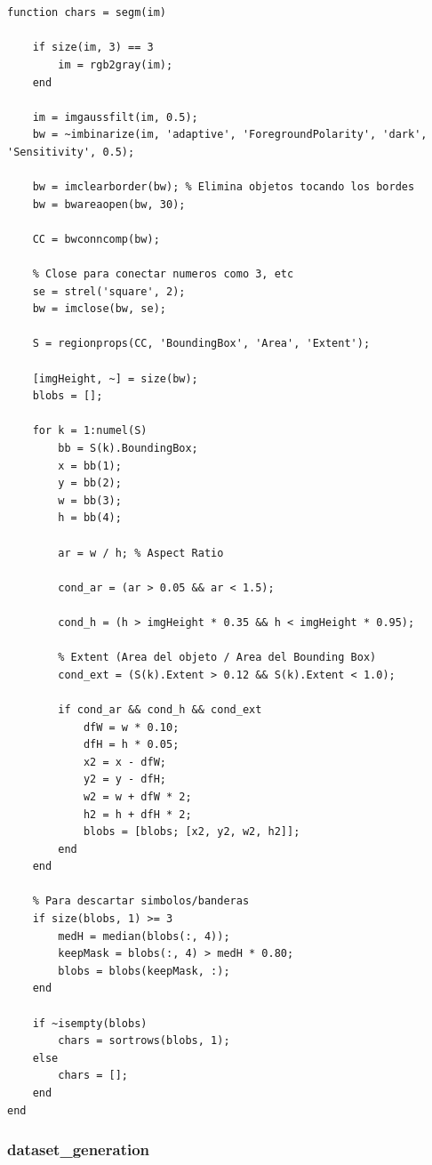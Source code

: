 \begin{verbatim}


function chars = segm(im)
   
    if size(im, 3) == 3
        im = rgb2gray(im);
    end

    im = imgaussfilt(im, 0.5);
    bw = ~imbinarize(im, 'adaptive', 'ForegroundPolarity', 'dark', 'Sensitivity', 0.5);

    bw = imclearborder(bw); % Elimina objetos tocando los bordes
    bw = bwareaopen(bw, 30); 

    CC = bwconncomp(bw);

    % Close para conectar numeros como 3, etc
    se = strel('square', 2); 
    bw = imclose(bw, se);

    S = regionprops(CC, 'BoundingBox', 'Area', 'Extent');
    
    [imgHeight, ~] = size(bw);
    blobs = [];

    for k = 1:numel(S)
        bb = S(k).BoundingBox;
        x = bb(1); 
        y = bb(2); 
        w = bb(3); 
        h = bb(4);

        ar = w / h; % Aspect Ratio

        cond_ar = (ar > 0.05 && ar < 1.5);

        cond_h = (h > imgHeight * 0.35 && h < imgHeight * 0.95);

        % Extent (Area del objeto / Area del Bounding Box)
        cond_ext = (S(k).Extent > 0.12 && S(k).Extent < 1.0);

        if cond_ar && cond_h && cond_ext
            dfW = w * 0.10;
            dfH = h * 0.05;
            x2 = x - dfW;
            y2 = y - dfH;
            w2 = w + dfW * 2;
            h2 = h + dfH * 2;
            blobs = [blobs; [x2, y2, w2, h2]];
        end
    end

    % Para descartar simbolos/banderas
    if size(blobs, 1) >= 3
        medH = median(blobs(:, 4));
        keepMask = blobs(:, 4) > medH * 0.80;
        blobs = blobs(keepMask, :);
    end

    if ~isempty(blobs)
        chars = sortrows(blobs, 1);
    else
        chars = [];
    end
end

\end{verbatim}


\subsubsection{dataset\_generation}

